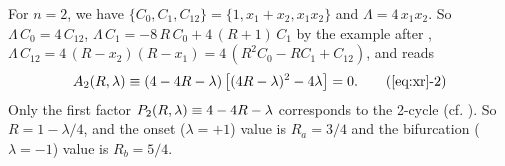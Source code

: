 \documentclass{ws-ijbc}
\begin{document}
For $n = 2$, we have %
$\{C_0, C_1, C_{12}\}
  = \{1,  x_1 + x_2, x_1 x_2 \}$
and
$\Lambda = 4 \, x_1 x_2$.
So
$\Lambda \, C_0 = 4 \, C_{12}$,
$\Lambda \, C_1 %
  = -8 \, R \, C_0 + 4 \, (R + 1) \, C_1$
by the example after ,
$\Lambda \, C_{12}
= 4 \, (R - x_2) (R - x_1) = 4 \, (R^2C_0-RC_1+C_{12})$,
and  reads
%
%
%
%
%
%
{\small
\begin{align}
A_2\Rlam \equiv (4 - 4R - \lambda)
  \left[
    (4 R-\lambda)^2 - 4 \lambda
  \right] = 0.
  \tag{\ref{eq:xr}-2}
\label{eq:xr2}
\end{align}
}
%
%
%
Only the first factor $P_2(R, \lambda) \equiv 4-4R -\lambda$
  corresponds to the 2-cycle  (cf. ).
So $R = 1 - \lambda/4$,
and the onset ($\lambda = +1$) value is $R_a = 3/4$ %
and the bifurcation ($\lambda = -1$) value is $R_b = 5/4$. %
%
\end{document}

